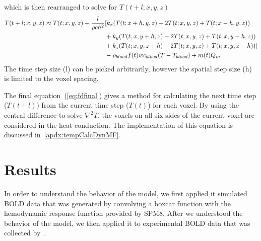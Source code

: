   which is then rearranged to solve for $T(t+l;x,y,z)$
  \begin{align}
    \label{eq:fdfinal}
    T(t+l;x,y,z) \approx T(t;x,y,z) + \frac{l}{\rho c h^2} 
    & [k_x (T(t;x+h,y,z)-2 T(t;x,y,z)+T(t;x-h,y,z)) \notag\\
    & + k_y (T(t;x,y+h,z)-2 T(t;x,y,z)+T(t;x,y-h,z))\notag\\
    & + k_z (T(t;x,y,z+h)-2 T(t;x,y,z)+T(t;x,y,z-h))]\notag\\
    & -\rho_{blood}f(t)wc_{blood}(T-T_{blood})+m(t)Q_{m}
  \end{align}
  The time step size (l) can be picked arbitrarily, however the spatial step size (h) is limited to the voxel spacing.
  
  The final equation~(\cref{eq:fdfinal}) gives a method for calculating the next time step ($T(t+l)$) from the current time step ($T(t)$) for each voxel.  By using the central difference to solve $\nabla^2 T$, the voxels on all six sides of the current voxel are considered in the heat conduction.  The implementation of this equation is discussed in~\cref{apdx:tempCalcDynMF}.
  
  \section{\label{sec:results} Results} 
   In order to understand the behavior of the model, we first applied it simulated BOLD data that was generated by convolving a boxcar function with the hemodynamic response function provided by SPM8.  After we understood the behavior of the model, we then applied it to experimental BOLD data that was collected by~\citet{dhamala}.

